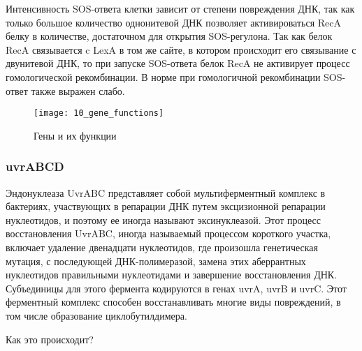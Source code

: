 Интенсивность SOS-ответа клетки зависит от степени повреждения ДНК, так как только большое количество однонитевой ДНК позволяет активироваться RecA белку в количестве, достаточном для открытия SOS-регулона. Так как белок RecA связывается c LexA в том же сайте, в котором происходит его связывание с двунитевой ДНК, то при запуске SOS-ответа белок RecA не активирует процесс гомологической рекомбинации. В норме при гомологичной рекомбинации SOS-ответ также выражен слабо.

\begin{figure}[H]
	\centering
	\texttt{[image: 10\_gene\_functions]}
	\caption{Гены и их функции}
\end{figure}

\subsubsection{uvrABCD}

Эндонуклеаза UvrABC представляет собой мультиферментный комплекс в бактериях, участвующих в репарации ДНК путем эксцизионной репарации нуклеотидов, и поэтому ее иногда называют эксинуклеазой. Этот процесс восстановления UvrABC, иногда называемый процессом короткого участка, включает удаление двенадцати нуклеотидов, где произошла генетическая мутация, с последующей ДНК-полимеразой, замена этих аберрантных нуклеотидов правильными нуклеотидами и завершение восстановления ДНК. Субъединицы для этого фермента кодируются в генах uvrA, uvrB и uvrC. Этот ферментный комплекс способен восстанавливать многие виды повреждений, в том числе образование циклобутилдимера.

Как это происходит?


